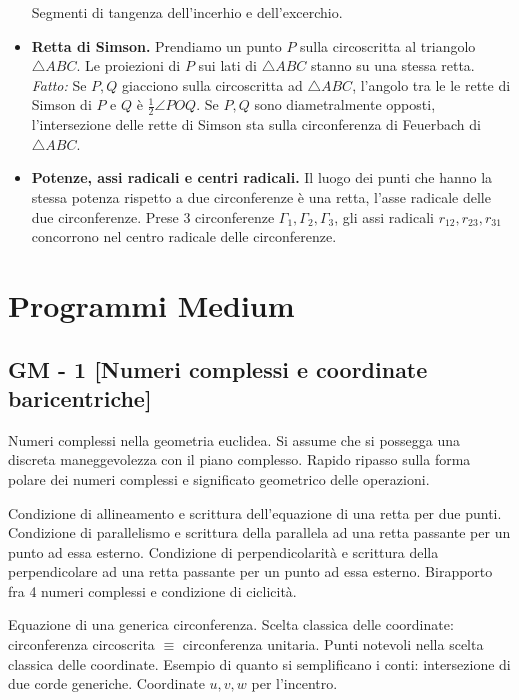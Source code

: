 \begin{itemize}
Segmenti di tangenza dell'incerhio e dell'excerchio.

\item \textbf{Retta di Simson.} Prendiamo un punto $P$ sulla circoscritta al triangolo $\triangle ABC$. Le proiezioni di $P$ sui lati di $\triangle ABC$ stanno su una stessa retta. \\
\textit{Fatto:} Se $P,Q$ giacciono sulla circoscritta ad $\triangle ABC$, l'angolo tra le le rette di Simson di $P$ e $Q$ è $\frac 12\angle POQ$. Se $P,Q$ sono diametralmente opposti, l'intersezione delle rette di Simson sta sulla circonferenza di Feuerbach di $\triangle ABC$.


\item \textbf{Potenze, assi radicali e centri radicali.} Il luogo dei punti che hanno la stessa potenza rispetto a due circonferenze è una retta, l'asse radicale delle due circonferenze. Prese $3$ circonferenze $\Gamma_1,\Gamma_2,\Gamma_3$, gli assi radicali $r_{12},r_{23},r_{31}$ concorrono nel centro radicale delle circonferenze.

\end{itemize}


\clearpage
\section{Programmi Medium}

\subsection{GM - 1 [Numeri complessi e coordinate baricentriche]}
Numeri complessi nella geometria euclidea. Si assume che si possegga una discreta maneggevolezza con il piano complesso.
Rapido ripasso sulla forma polare dei numeri complessi e significato geometrico delle operazioni.

Condizione di allineamento e scrittura dell'equazione di una retta per due punti. Condizione di parallelismo e scrittura della parallela ad una retta passante per un punto ad essa esterno. Condizione di perpendicolarità e scrittura della perpendicolare ad una retta passante per un punto ad essa esterno. Birapporto fra 4 numeri complessi e condizione di ciclicità.

Equazione di una generica circonferenza. Scelta classica delle coordinate: circonferenza circoscrita $\equiv$ circonferenza unitaria. Punti notevoli nella scelta classica delle coordinate. Esempio di quanto si semplificano i conti: intersezione di due corde generiche. Coordinate $u,v,w$ per l'incentro. 

